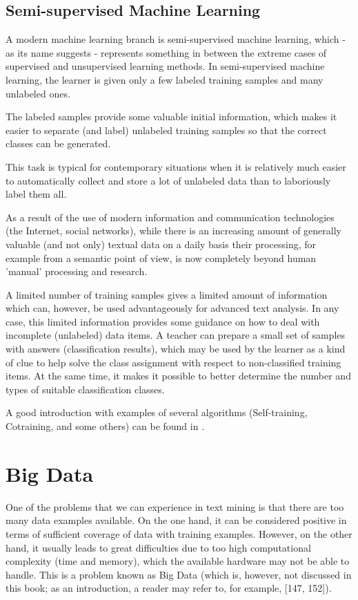 \documentclass[11pt,openany,executivepaper]{book}
\begin{document}
\subsection{Semi-supervised Machine Learning}
\begin{sloppypar}
A modern machine learning branch is semi-supervised machine learning, which - as its name suggests - represents something in between the extreme cases of supervised and unsupervised learning methods. In semi-supervised machine learning, the learner is given only a few labeled training samples and many unlabeled ones.
\end{sloppypar}

The labeled samples provide some valuable initial information, which makes it easier to separate (and label) unlabeled training samples so that the correct classes can be generated.

This task is typical for contemporary situations when it is relatively much easier to automatically collect and store a lot of unlabeled data than to laboriously label them all.

As a result of the use of modern information and communication technologies (the Internet, social networks), while there is an increasing amount of generally valuable (and not only) textual data on a daily basis their processing, for example from a semantic point of view, is now completely beyond human 'manual' processing and research.

A limited number of training samples gives a limited amount of information which can, however, be used advantageously for advanced text analysis. In any case, this limited information provides some guidance on how to deal with incomplete (unlabeled) data items. A teacher can prepare a small set of samples with answers (classification results), which may be used by the learner as a kind of clue to help solve the class assignment with respect to non-classified training items. At the same time, it makes it possible to better determine the number and types of suitable classification classes.

A good introduction with examples of several algorithms (Self-training, Cotraining, and some others) can be found in \cite{1}.

\section{Big Data}
One of the problems that we can experience in text mining is that there are too many data examples available. On the one hand, it can be considered positive in terms of sufficient coverage of data with training examples. However, on the other hand, it usually leads to great difficulties due to too high computational complexity (time and memory), which the available hardware may not be able to handle. This is a problem known as Big Data (which is, however, not discussed in this book; as an introduction, a reader may refer to, for example, [147, 152]).
\end{document}
